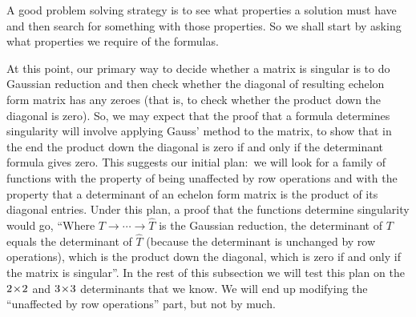 A good problem solving strategy is to
see what properties a solution must have and
then search for something with those properties.
So we shall start by asking what properties we require of the formulas.

At this point,
our primary way to decide whether a matrix is singular is to do Gaussian 
reduction and then check whether 
the diagonal of resulting echelon form matrix has any zeroes
(that is, to check whether the product down the diagonal is zero).
So, we may expect that the proof that a formula determines singularity 
will involve applying Gauss' method to the matrix,
to show that in the end the product down the diagonal is zero if and only if
the determinant formula gives zero. 
This suggests our initial plan:~we will look for a family of 
functions with the property of being
unaffected by row operations and with the property that a determinant of an
echelon form matrix is the product of its diagonal entries.
Under this plan, a proof that the functions determine singularity would go, 
``Where $T\rightarrow\cdots\rightarrow\hat{T}$ is the Gaussian
reduction, the determinant of $T$ equals the
determinant of $\hat{T}$ (because the determinant is unchanged by row
operations), which is the product down the diagonal, which is
zero if and only if the matrix is singular''.
In the rest of this subsection we will test this plan on the 
$2 \! \times \! 2$ and $3 \! \times \! 3$ determinants that we know.
We will end up modifying the ``unaffected by row operations'' 
part, but not by much.

